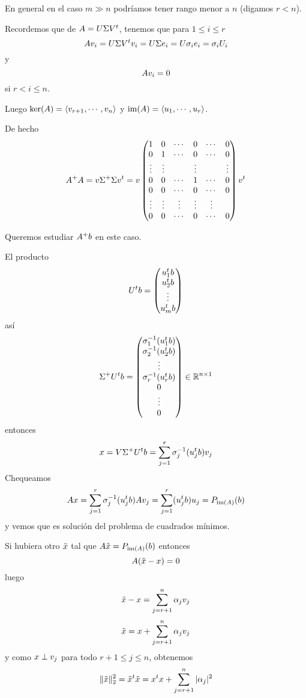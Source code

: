 En general en el caso $m \gg n$ podríamos tener rango menor a $n$ (digamos $r<n$).

Recordemos que de $\Ab=\Ub\Sigmab\Vb^t$, tenemos que para $1\le i\le r$
$$
\Ab\vb_i=\Ub\Sigmab\Vb^t\vb_i=\Ub\Sigmab\eb_i=\Ub\sigma_i\eb_i=\sigma_i\Ub_i
$$
y
$$
\Ab\vb_i=\cero
$$
si $r<i\le n$.


Luego $\ker(\Ab)=\langle \vb_{r+1},\cdots,\vb_n\rangle $ y
$\im(\Ab)=\langle \ub_1,\cdots,\ub_r\rangle$.

De hecho
$$
\Ab^+\Ab=
\vb\Sigmab^+\Sigmab\vb^t=
\vb\begin{pmatrix}
1&0&\cdots &0&\cdots &0\\
0&1&\cdots &0&\cdots &0\\
\vdots&\vdots&&\vdots&&\vdots\\
0&0&\cdots &1&\cdots &0\\
0&0&\cdots &0&\cdots &0\\
\vdots &\vdots&\vdots &\vdots &\vdots\\

0&0& \cdots &0&\cdots &0\\

\end{pmatrix}
\vb^t
$$

Queremos estudiar $\Ab^+\bb$ en este caso.

El producto
$$
\Ub^t\bb=
\begin{pmatrix}
\ub_1^t\bb\\
\ub_2^t\bb\\
\vdots\\
\ub_m^t\bb
\end{pmatrix}
$$
así
$$
\Sigmab^+\Ub^t\bb=
\begin{pmatrix}
\sigma_1^{-1}(\ub_1^t\bb)\\
\sigma_2^{-1}(\ub_2^t\bb)\\
\vdots\\
\sigma_r^{-1}(\ub_r^t\bb)\\
0\\
\vdots\\
0
\end{pmatrix} \in \R^{n\times 1}
$$
entonces
$$
\xb=\Vb\Sigmab^+\Ub^t\bb=
\sum_{j=1}^r\sigma_j^{-1}(\ub_j^t\bb)\vb_j
$$
Chequeamos
$$
\Ab\xb=\sum_{j=1}^r\sigma_j^{-1}(\ub_j^t\bb)\Ab\vb_j=\sum_{j=1}^r(\ub_j^t\bb)\ub_j=P_{\im(A)}(\bb)
$$
y vemos que es solución del problema de cuadrados mínimos.

Si hubiera otro $\tilde \xb$ tal que $\Ab\tilde\xb=P_{\im(A)}(\bb)$ entonces
$$
\Ab(\tilde\xb-\xb)=\cero
$$
luego
$$
\tilde\xb-\xb=\sum_{j=r+1}^n\alpha_j\vb_j
$$
$$
\tilde\xb= \xb+\sum_{j=r+1}^n\alpha_j\vb_j
$$
y como $\xb\perp \vb_j$ para todo $r+1\le j\le n$, obtenemos
$$
\|\tilde\xb\|_2^2=\tilde\xb^t\tilde\xb=\xb^t\xb+\sum_{j=r+1}^n|\alpha_j|^2
$$

